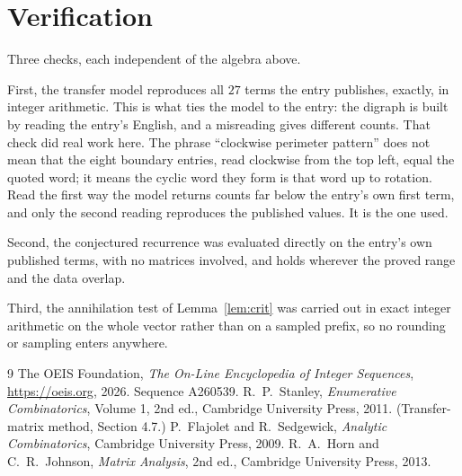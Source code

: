 \documentclass[11pt,a4paper]{article}
\theoremstyle{plain}
\theoremstyle{definition}
\begin{document}
\section{Verification}

Three checks, each independent of the algebra above.

First, the transfer model reproduces all $27$ terms the entry publishes, exactly, in
integer arithmetic. This is what ties the model to the entry: the digraph is built by reading
the entry's English, and a misreading gives different counts. That check did real work here. The phrase ``clockwise perimeter pattern'' does not mean that the eight boundary entries, read clockwise from the top left, equal the quoted word; it means the cyclic word they form is that word up to rotation. Read the first way the model returns counts far below the entry's own first term, and only the second reading reproduces the published values. It is the one used.

Second, the conjectured recurrence was evaluated directly on the entry's own published terms,
with no matrices involved, and holds wherever the proved range and the data overlap.

Third, the annihilation test of Lemma~\ref{lem:crit} was carried out in exact integer
arithmetic on the whole vector rather than on a sampled prefix, so no rounding or sampling
enters anywhere.

\begin{thebibliography}{9}
 The OEIS Foundation, \emph{The On-Line Encyclopedia of Integer
Sequences}, \url{https://oeis.org}, 2026. Sequence A260539.
 R.~P.~Stanley, \emph{Enumerative Combinatorics}, Volume 1, 2nd ed.,
Cambridge University Press, 2011. (Transfer-matrix method, Section 4.7.)
 P.~Flajolet and R.~Sedgewick, \emph{Analytic Combinatorics}, Cambridge
University Press, 2009.
 R.~A.~Horn and C.~R.~Johnson, \emph{Matrix Analysis}, 2nd ed., Cambridge
University Press, 2013.
\end{thebibliography}
\end{document}
